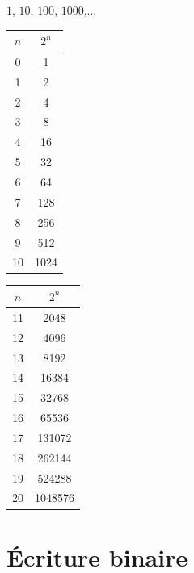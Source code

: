 \begin{frame}


\pause
$1$, $10$, $100$, $1000$,... 

\medskip
\pause
{}
\begin{center}
\begin{tabular}{cc}
$n$&$2^n$\\\hline
0&1\\
1&2\\
2&4\\
3&8\\
4&16\\
5&32\\
6&64\\
7&128\\
8&256\\
9&512\\
10&1024\\
\end{tabular}\qquad\qquad\qquad
\begin{tabular}{cc}
$n$&$2^n$\\\hline
11&2048\\
12&4096\\
13&8192\\
14&16384\\
15&32768\\
16&65536\\
17&131072\\
18&262144\\
19&524288\\
20&1048576
\end{tabular}
\end{center}

\end{frame}



\section{\'Ecriture binaire}




